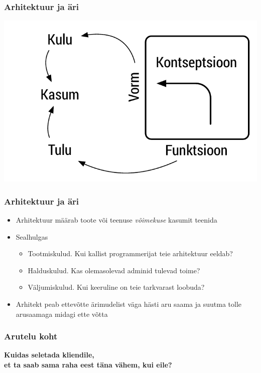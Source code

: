 \begin{frame}[fragile]
  \frametitle{Arhitektuur ja äri}
  	\begin{center}
			\includegraphics[width=.7\textwidth]{ffc_profit.pdf}
	\end{center}
\end{frame}

\begin{frame}[fragile]
	\frametitle{Arhitektuur ja äri}
			\begin{itemize}
				\item Arhitektuur määrab toote või teenuse \emph{võimekuse} kasumit teenida
				\item Sealhulgas
				\begin{itemize}
					\item Tootmiskulud. Kui kallist programmerijat teie arhitektuur eeldab?
					\item Halduskulud. Kas olemasolevad adminid tulevad toime?
					\item Väljumiskulud. Kui keeruline on teie tarkvarast loobuda?
				\end{itemize}
				\item Arhitekt peab ettevõtte ärimudelist väga hästi aru saama ja suutma tolle arusaamaga midagi ette võtta
			\end{itemize}
\end{frame}

\begin{frame}[fragile]
  \frametitle{Arutelu koht}
		\begin{center}
			\textbf{Kuidas seletada kliendile, \\et ta saab sama raha eest täna vähem, kui eile?}
		\end{center}
\end{frame}

